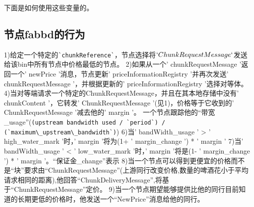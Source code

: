 下面是如何使用这些变量的。

\subsection{节点fabbd的行为}
1)给定一个特定的\lstinline{`chunkReference`}，节点选择将$`ChunkRequestMessage`$发送给该bin中所有节点中价格最低的节点。
2)如果从一个' chunkRequestMessage '返回一个' newPrice '消息，节点更新' priceInformationRegistry '并再次发送' chunkRequestMessage '，并根据更新的' priceInformationRegistry '选择对等体。 
4)当对等端请求一个特定的ChunkRequestMessage，并且在其本地存储中没有' chunkContent '，它转发' ChunkRequestMessage '(见1)，价格等于它收到的' ChunkRequestMessage '减去他的' margin '。
一个节点跟踪他的“带宽\_usage”(\lstinline{(upstream bandwidth used / `period`) / (`maximum\_upstream\_bandwidth`)})
6)当' bandWidth\_usage ' > ' high\_water\_mark '时，' margin '将为(1+ ' margin\_change ') * ' margin '
7)当' bandWidth\_usage ' < ' low\_water\_mark '时，' margin '将是(1- ' margin\_change ') * ' margin '。“保证金\_change”表示 
8)当一个节点可以得到更便宜的价格而不是“块”要求由“ChunkRequestMessage”(上游同行改变价格,数量的啤酒花小于平均请求相同的距离),他回答“ChunkDeliveryMessage”,将基于“ChunkRequestMessage”定价。 
9)当一个节点期望能够提供比他的同行目前知道的长期更低的价格时，他发送一个“NewPrice”消息给他的同行。 
